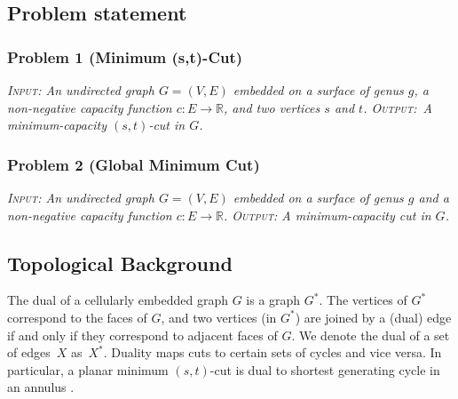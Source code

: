 \documentclass[natbib]{svcyclop}
\begin{document}
\subsection{Problem statement}

\subsubsection{Problem 1 (Minimum (s,t)-Cut)}
{\itshape
\textsc{Input}: An undirected graph $G = (V, E)$ embedded on a surface of genus $g$, a non-negative capacity function $c\colon E \to \mathbb{R}$, and two vertices $s$ and $t$. \textsc{Output}:~A minimum-capacity $(s,t)$-cut in $G$.}


\subsubsection{Problem 2 (Global Minimum Cut)}
{\itshape
\textsc{Input}: An undirected graph $G = (V, E)$  embedded on a surface of genus $g$ and a non-negative capacity function $c\colon E \to \mathbb{R}$.  \textsc{Output}: A minimum-capacity cut in $G$.}




\KeyRes

\subsection{Topological Background}


The dual of a cellularly embedded graph $G$ is a graph $G^*$.  The vertices of $G^*$ correspond to the faces of $G$, and two vertices (in $G^*$) are joined by a (dual) edge if and only if they correspond to adjacent faces of $G$.
We denote the dual of a set of edges~$X$ as~$X^*$.
Duality maps cuts to certain sets of cycles and vice versa.
In particular, a planar minimum $(s,t)$-cut is dual to shortest generating cycle in an annulus \cite{is-mfpn-79, r-mstcp-83}.
\end{document}
